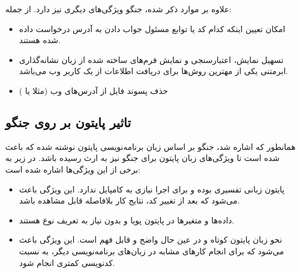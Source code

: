 {علاوه بر موارد ذکر شده، جنگو ویژگی‌های دیگری نیز دارد. از جمله:
\begin{itemize}
	\item امکان تعیین اینکه کدام کد یا توابع مسئول جواب دادن به آدرس درخواست داده شده هستند.
	\item تسهیل نمایش، اعتبارسنجی و نمایش فرم‌های ساخته شده از زبان نشانه‌گذاری ابرمتنی یکی از مهترین روش‌ها برای دریافت اطلاعات از یک کاربر وب می‌باشد.
	\item حذف پسوند فایل از آدرس‌‌های وب (مثلا  یا )
\end{itemize}
 
\subsection{تاثیر پایتون بر روی جنگو}
همانطور که اشاره شد، جنگو بر اساس زبان برنامه‌نویسی پایتون نوشته شده که باعث شده است تا ویژگی‌های زبان پایتون برای جنگو نیز به ارث رسیده باشد. در زیر به برخی از این ویژگی‌ها اشاره شده است:
\begin{itemize}
	\item پایتون زبانی تفسیری بوده و برای اجرا نیازی به کامپایل ندارد. این ویژگی باعث می‌شود که بعد از تغییر کد، نتایج کار بلافاصله قابل مشاهده باشد.
	\item داده‌ها و متغیر‌ها در پایتون پویا و بدون نیاز به تعریف نوع هستند.
	\item نحو زبان پایتون کوتاه و در عین حال واضح و قابل فهم است. این ویژگی باعث می‌شود که برای انجام کارهای مشابه در زبان‌های برنامه‌نویسی دیگر، به نسبت کدنویسی کمتری انجام شود.
\end{itemize}

 
}

